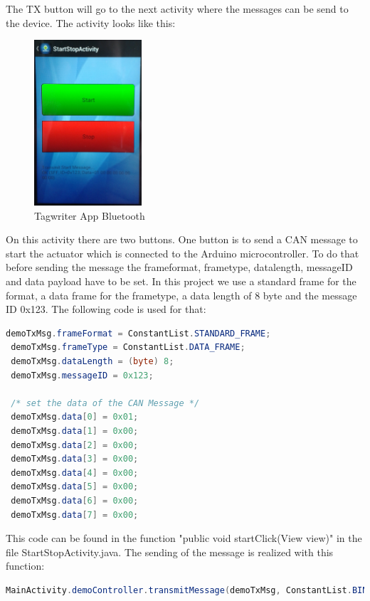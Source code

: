 \documentclass[11pt]{article}
\begin{document}
The TX button will go to the next activity where the messages can be send to the device. The activity looks like this: 

\begin{figure}[H]

 \centering
 \includegraphics [width=4cm]{startstop.png} 
 \caption{Tagwriter App Bluetooth}
\end{figure}

On this activity there are two buttons. One button is to send a CAN message to start the actuator which is connected to the Arduino microcontroller. To do that before sending the message the frameformat, frametype, datalength, messageID and data payload have to be set. In this project we use a standard frame for the format, a data frame for the frametype, a data length of 8 byte and the message ID 0x123. The following code is used for that:

\begin{lstlisting}[language=java]       
 demoTxMsg.frameFormat = ConstantList.STANDARD_FRAME;
 demoTxMsg.frameType = ConstantList.DATA_FRAME;
 demoTxMsg.dataLength = (byte) 8;
 demoTxMsg.messageID = 0x123;
       
 /* set the data of the CAN Message */
 demoTxMsg.data[0] = 0x01;
 demoTxMsg.data[1] = 0x00;
 demoTxMsg.data[2] = 0x00;
 demoTxMsg.data[3] = 0x00;
 demoTxMsg.data[4] = 0x00;
 demoTxMsg.data[5] = 0x00;
 demoTxMsg.data[6] = 0x00;
 demoTxMsg.data[7] = 0x00;
\end{lstlisting}

This code can be found in the function "public void startClick(View view)" in the file StartStopActivity.java. The sending of the message is realized with this function:

\begin{lstlisting}[language=java]  
MainActivity.demoController.transmitMessage(demoTxMsg, ConstantList.BINARY_FORMAT);
\end{lstlisting}
\end{document}
